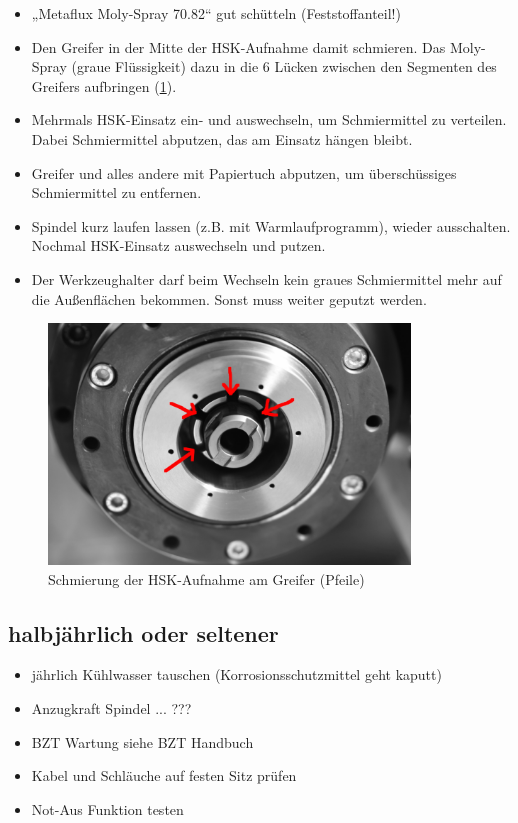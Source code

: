 \documentclass{\basedir/fablab-document}
\begin{document}
\begin{itemize}
	\item „Metaflux Moly-Spray 70.82“ gut schütteln (Feststoffanteil!)
	\item Den Greifer in der Mitte der HSK-Aufnahme damit schmieren. Das Moly-Spray (graue Flüssigkeit) dazu in die 6 Lücken zwischen den Segmenten des Greifers aufbringen (\cref{fig:hsk-greifer}). 
	\item Mehrmals HSK-Einsatz ein- und auswechseln, um Schmiermittel zu verteilen. Dabei Schmiermittel abputzen, das am Einsatz hängen bleibt.
	\item Greifer und alles andere mit Papiertuch abputzen, um überschüssiges Schmiermittel zu entfernen.
	\item Spindel kurz laufen lassen (z.B. mit Warmlaufprogramm), wieder ausschalten. Nochmal HSK-Einsatz auswechseln und putzen.
	\item Der Werkzeughalter darf beim Wechseln kein graues Schmiermittel mehr auf die Außenflächen bekommen. Sonst muss weiter geputzt werden.
\end{itemize}

\begin{figure}[hb]
\centering
\includegraphics[height=6.4cm]{./img/hsk-aufnahme-segmente.jpg}
\caption{Schmierung der HSK-Aufnahme am Greifer (Pfeile)}
\label{fig:hsk-greifer}
\end{figure}

\subsection{halbjährlich oder seltener}

\begin{itemize}
	\item jährlich Kühlwasser tauschen (Korrosionsschutzmittel geht kaputt)
	\item Anzugkraft Spindel ... ???
	\item BZT Wartung siehe BZT Handbuch
	\item Kabel und Schläuche auf festen Sitz prüfen
	\item Not-Aus Funktion testen
\end{itemize}
\end{document}
